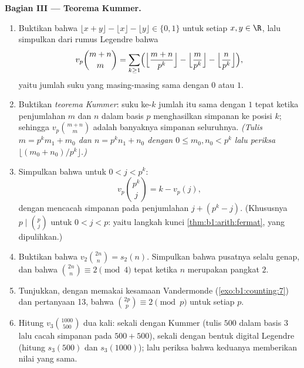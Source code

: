 \begin{problem}
\medskip
\noindent\textbf{Bagian III --- Teorema Kummer.}
\begin{enumerate}[resume]
  \item Buktikan bahwa $\lfloor x + y \rfloor - \lfloor x \rfloor -
        \lfloor y \rfloor \in \{0, 1\}$ untuk setiap $x, y \in \R$, lalu
        simpulkan dari rumus Legendre bahwa
        \[
        v_p\binom{m+n}m
        = \sum_{k\geq1}\Bigl(
        \Bigl\lfloor\frac{m+n}{p^k}\Bigr\rfloor
        - \Bigl\lfloor\frac{m}{p^k}\Bigr\rfloor
        - \Bigl\lfloor\frac{n}{p^k}\Bigr\rfloor\Bigr),
        \]
        yaitu jumlah suku yang masing-masing sama dengan $0$ atau $1$.
  \item Buktikan \emph{teorema Kummer}: suku ke-$k$ jumlah itu
        sama dengan $1$ tepat ketika penjumlahan $m$ dan $n$ dalam
        basis $p$ menghasilkan simpanan ke posisi $k$; sehingga
        $v_p\binom{m+n}m$ adalah banyaknya simpanan seluruhnya.
        \emph{(Tulis $m = p^km_1 + m_0$ dan $n = p^kn_1 + n_0$
        dengan $0 \leq m_0, n_0 < p^k$ lalu periksa $\lfloor (m_0 +
        n_0)/p^k \rfloor$.)}
  \item Simpulkan bahwa untuk $0 < j < p^k$:
        \[
        v_p\binom{p^k}{j} = k - v_p(j) ,
        \]
        dengan mencacah simpanan pada penjumlahan $j + (p^k - j)$.
        (Khususnya $p \mid \binom p j$ untuk $0 < j < p$: yaitu
        langkah kunci \cref{thm:b1:arith:fermat}, yang dipulihkan.)
  \item Buktikan bahwa $v_2\binom{2n}n = s_2(n)$. Simpulkan bahwa
         pusatnya selalu genap, dan bahwa
        $\binom{2n}n \equiv 2 \pmod 4$ tepat ketika $n$ merupakan pangkat
        $2$.
  \item Tunjukkan, dengan memakai kesamaan Vandermonde
        (\cref{exo:b1:counting:7}) dan pertanyaan 13, bahwa
        $\binom{2p}p \equiv 2 \pmod p$ untuk setiap  $p$.
  \item Hitung $v_3\binom{1000}{500}$ dua kali: sekali dengan Kummer
        (tulis $500$ dalam basis $3$ lalu cacah simpanan pada $500 +
        500$), sekali dengan bentuk digital Legendre (hitung $s_3(500)$
        dan $s_3(1000)$); lalu periksa bahwa keduanya memberikan nilai yang sama.
\end{enumerate}


\end{problem}
